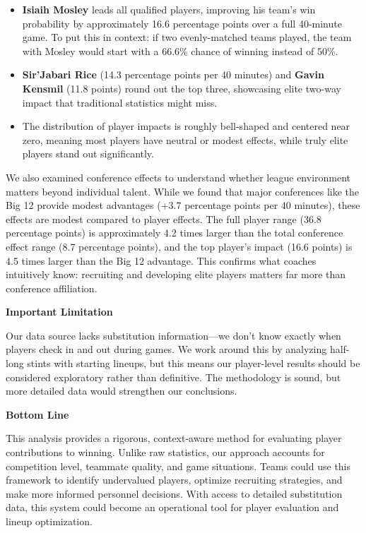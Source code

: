 \documentclass[
  letterpaper,
  DIV=11,
  numbers=noendperiod]{scrartcl}
\begin{document}
\begin{itemize}
\item
  \textbf{Isiaih Mosley} leads all qualified players, improving his
  team's win probability by approximately 16.6 percentage points over a
  full 40-minute game. To put this in context: if two evenly-matched
  teams played, the team with Mosley would start with a 66.6\% chance of
  winning instead of 50\%.
\item
  \textbf{Sir'Jabari Rice} (14.3 percentage points per 40 minutes) and
  \textbf{Gavin Kensmil} (11.8 points) round out the top three,
  showcasing elite two-way impact that traditional statistics might
  miss.
\item
  The distribution of player impacts is roughly bell-shaped and centered
  near zero, meaning most players have neutral or modest effects, while
  truly elite players stand out significantly.
\end{itemize}

We also examined conference effects to understand whether league
environment matters beyond individual talent. While we found that major
conferences like the Big 12 provide modest advantages (+3.7 percentage
points per 40 minutes), these effects are modest compared to player
effects. The full player range (36.8 percentage points) is approximately
4.2 times larger than the total conference effect range (8.7 percentage
points), and the top player's impact (16.6 points) is 4.5 times larger
than the Big 12 advantage. This confirms what coaches intuitively know:
recruiting and developing elite players matters far more than conference
affiliation.

\textbf{Important Limitation}

Our data source lacks substitution information---we don't know exactly
when players check in and out during games. We work around this by
analyzing half-long stints with starting lineups, but this means our
player-level results should be considered exploratory rather than
definitive. The methodology is sound, but more detailed data would
strengthen our conclusions.

\textbf{Bottom Line}

This analysis provides a rigorous, context-aware method for evaluating
player contributions to winning. Unlike raw statistics, our approach
accounts for competition level, teammate quality, and game situations.
Teams could use this framework to identify undervalued players, optimize
recruiting strategies, and make more informed personnel decisions. With
access to detailed substitution data, this system could become an
operational tool for player evaluation and lineup optimization.
\end{document}
